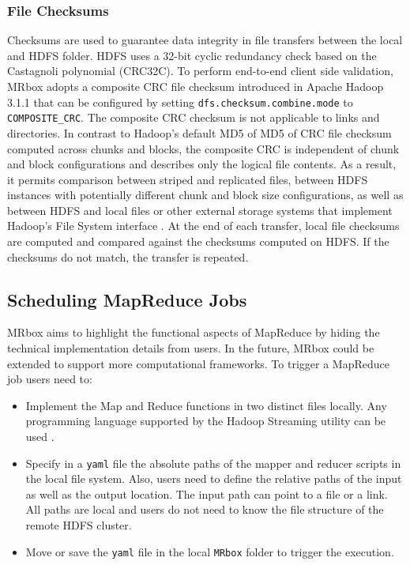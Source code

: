 \subsubsection{File Checksums}
Checksums are used to guarantee data integrity in file transfers between the local and HDFS folder. HDFS uses a 32-bit cyclic redundancy check based on the Castagnoli polynomial (CRC32C). To perform end-to-end client side validation, MRbox adopts a composite CRC file checksum introduced in Apache Hadoop 3.1.1 that can be configured by setting \texttt{dfs.checksum.combine.mode} to \texttt{COMPOSITE\_CRC}. The composite CRC checksum is not applicable to links and directories. In contrast to Hadoop's default MD5 of MD5 of CRC file checksum computed across chunks and blocks, the composite CRC is independent of chunk and block configurations and describes only the logical file contents. As a result, it permits comparison between striped and replicated files, between HDFS instances with potentially different chunk and block size configurations, as well as between HDFS and local files or other external storage systems that implement Hadoop's File System interface \cite{googlecloudcrc,hadoopcrc}. 
At the end of each transfer, local file checksums are computed and compared against the checksums computed on HDFS. If the checksums do not match, the transfer is repeated.

\subsection{Scheduling MapReduce Jobs}
MRbox aims to highlight the functional aspects of MapReduce by hiding the technical implementation details from users. In the future, MRbox could be extended to support more computational frameworks. To trigger a MapReduce job users need to:
\begin{itemize}
    \item 
    Implement the Map and Reduce functions in two distinct files locally. Any programming language supported by the Hadoop Streaming utility can be used \cite{hadoopstreaming}.
    \item 
    Specify in a \texttt{yaml} file the absolute paths of the mapper and reducer scripts in the local file system. Also, users need to define the relative paths of the input as well as the output location. The input path can point to a file or a link. All paths are local and users do not need to know the file structure of the remote HDFS cluster.
    \item Move or save the \texttt{yaml} file in the local \texttt{MRbox} folder to trigger the execution.
\end{itemize}

